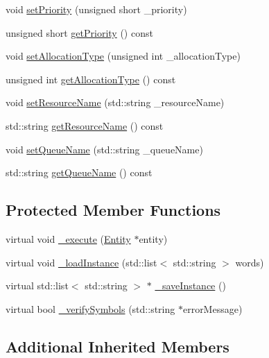 \begin{DoxyCompactItemize}
\item 
void \hyperlink{class_seize_aa9c7a856ef519696526192a06dab9551}{set\-Priority} (unsigned short \-\_\-priority)
\item 
unsigned short \hyperlink{class_seize_aae382dc1d1d3dc9a3de927cc9d7811c9}{get\-Priority} () const 
\item 
void \hyperlink{class_seize_a4f6354bf4897ce4c46ff9c1e2dd5c150}{set\-Allocation\-Type} (unsigned int \-\_\-allocation\-Type)
\item 
unsigned int \hyperlink{class_seize_ac40f22e56d4448c5d5bae40b64ef4deb}{get\-Allocation\-Type} () const 
\item 
void \hyperlink{class_seize_a2bdaa616c4fd499f754099eb59729547}{set\-Resource\-Name} (std\-::string \-\_\-resource\-Name)
\item 
std\-::string \hyperlink{class_seize_a30781601e8fcfb165c99aee731c081e8}{get\-Resource\-Name} () const 
\item 
void \hyperlink{class_seize_a4d24a3326db05e92439379e1c4efa940}{set\-Queue\-Name} (std\-::string \-\_\-queue\-Name)
\item 
std\-::string \hyperlink{class_seize_a37f2b1a10e1ae390d5186a87bdebe30a}{get\-Queue\-Name} () const 
\end{DoxyCompactItemize}
\subsection*{Protected Member Functions}
\begin{DoxyCompactItemize}
\item 
virtual void \hyperlink{class_seize_a96f6517a40b3bfd0d5ea753d59cef797}{\-\_\-execute} (\hyperlink{class_entity}{Entity} $\ast$entity)
\item 
virtual void \hyperlink{class_seize_a421a0ec6382cb30f6a0342f8dea050db}{\-\_\-load\-Instance} (std\-::list$<$ std\-::string $>$ words)
\item 
virtual std\-::list$<$ std\-::string $>$ $\ast$ \hyperlink{class_seize_a38a8af6942b51ce11d191469d277661d}{\-\_\-save\-Instance} ()
\item 
virtual bool \hyperlink{class_seize_a51dc9257dc692083006f676546ddfff8}{\-\_\-verify\-Symbols} (std\-::string $\ast$error\-Message)
\end{DoxyCompactItemize}
\subsection*{Additional Inherited Members}


